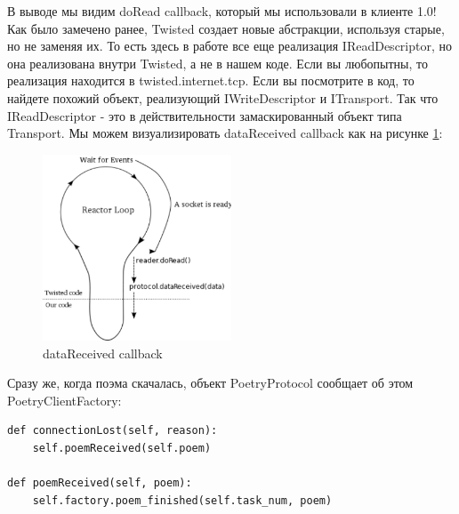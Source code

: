 В выводе мы видим doRead callback, который мы использовали в клиенте 1.0! 
Как было замечено ранее, Twisted создает новые абстракции, используя 
старые, но не заменяя их. То есть здесь в работе все еще реализация IReadDescriptor, 
но она реализована внутри Twisted, а не в нашем коде. Если вы любопытны, то 
реализация находится в twisted.internet.tcp. Если вы посмотрите в код, то найдете 
похожий объект, реализующий IWriteDescriptor и ITransport. Так что IReadDescriptor - 
это в действительности замаскированный объект типа Transport. Мы можем визуализировать 
dataReceived callback как на рисунке \ref{fig:reactor-data-received}:

\begin{figure}[h]
\begin{center}
    \includegraphics[width=0.5\textwidth]{images/reactor-data-received.pdf}
    \caption{dataReceived callback\label{fig:reactor-data-received}}
\end{center}
\end{figure}

Сразу же, когда поэма скачалась, объект PoetryProtocol сообщает 
об этом PoetryClientFactory:

\begin{scriptsize}\begin{verbatim}
def connectionLost(self, reason):
    self.poemReceived(self.poem)

def poemReceived(self, poem):
    self.factory.poem_finished(self.task_num, poem)
\end{verbatim}\end{scriptsize}


